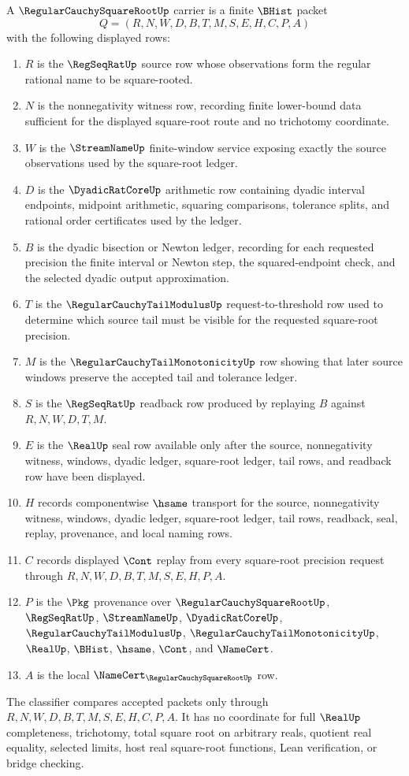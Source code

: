 \begin{definition}
\label{def:regular-cauchy-square-root-carrier}
A $\RegularCauchySquareRootUp$ carrier is a finite $\BHist$ packet
$$
Q=(R,N,W,D,B,T,M,S,E,H,C,P,A)
$$
with the following displayed rows:
\begin{enumerate}
\item $R$ is the $\RegSeqRatUp$ source row whose observations form the regular rational name to be square-rooted.
\item $N$ is the nonnegativity witness row, recording finite lower-bound data sufficient for the displayed square-root route and no trichotomy coordinate.
\item $W$ is the $\StreamNameUp$ finite-window service exposing exactly the source observations used by the square-root ledger.
\item $D$ is the $\DyadicRatCoreUp$ arithmetic row containing dyadic interval endpoints, midpoint arithmetic, squaring comparisons, tolerance splits, and rational order certificates used by the ledger.
\item $B$ is the dyadic bisection or Newton ledger, recording for each requested precision the finite interval or Newton step, the squared-endpoint check, and the selected dyadic output approximation.
\item $T$ is the $\RegularCauchyTailModulusUp$ request-to-threshold row used to determine which source tail must be visible for the requested square-root precision.
\item $M$ is the $\RegularCauchyTailMonotonicityUp$ row showing that later source windows preserve the accepted tail and tolerance ledger.
\item $S$ is the $\RegSeqRatUp$ readback row produced by replaying $B$ against $R,N,W,D,T,M$.
\item $E$ is the $\RealUp$ seal row available only after the source, nonnegativity witness, windows, dyadic ledger, square-root ledger, tail rows, and readback row have been displayed.
\item $H$ records componentwise $\hsame$ transport for the source, nonnegativity witness, windows, dyadic ledger, square-root ledger, tail rows, readback, seal, replay, provenance, and local naming rows.
\item $C$ records displayed $\Cont$ replay from every square-root precision request through $R,N,W,D,B,T,M,S,E,H,P,A$.
\item $P$ is the $\Pkg$ provenance over $\RegularCauchySquareRootUp$, $\RegSeqRatUp$, $\StreamNameUp$, $\DyadicRatCoreUp$, $\RegularCauchyTailModulusUp$, $\RegularCauchyTailMonotonicityUp$, $\RealUp$, $\BHist$, $\hsame$, $\Cont$, and $\NameCert$.
\item $A$ is the local $\NameCert_{\RegularCauchySquareRootUp}$ row.
\end{enumerate}
The classifier compares accepted packets only through $R,N,W,D,B,T,M,S,E,H,C,P,A$. It has no coordinate for full $\RealUp$ completeness, trichotomy, total square root on arbitrary reals, quotient real equality, selected limits, host real square-root functions, Lean verification, or bridge checking.
\end{definition}
